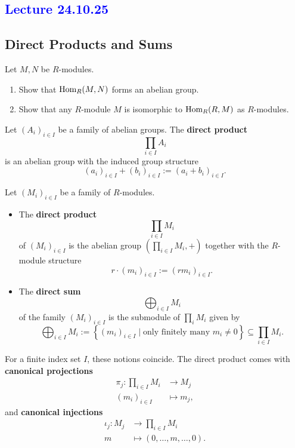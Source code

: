 \subsection{\textcolor{blue}{Lecture 24.10.25}}
\subsection*{Direct Products and Sums}
\begin{ex}
    Let $M,N$ be $R$-modules.
   \begin{enumerate}
       \item Show that $\operatorname{\text{Hom}}_R(M,N)$ forms an abelian group.
        \item Show that any $R$-module $M$ is isomorphic to $\operatorname{\text{Hom}}_R(R,M)$ as $R$-modules.
   \end{enumerate} 
\end{ex}
\begin{definition}
    Let $(A_i)_{i \in I}$ be a family of abelian groups. The \textbf{direct product} \[
        \prod_{i \in I} A_i
    \] is an abelian group with the induced group structure \[
    (a_i)_{i \in I} + (b_i)_{i \in I} := (a_i + b_i)_{i \in I}
    .\]  
\end{definition}
\begin{definition}
    Let $(M_i)_{i \in I}$ be a family of $R$-modules.
    \begin{itemize}
        \item The \textbf{direct product} \[
                \prod_{i \in I}M_i
            \] of $(M_i)_{i \in I}$ is the abelian group $(\prod_{i \in I}M_i,+) $ together with the $R$-module structure \[
            r \cdot (m_i)_{i \in I} := (rm_i)_{i \in I}
            .\] 
        \item The \textbf{direct sum} \[
                \bigoplus_{i \in I} M_i
            \] of the family $(M_i)_{i \in I}$ is the submodule of $\prod_iM_i$ given by \[
            \bigoplus_{i \in I} M_i:= \left\{(m_i)_{i \in I} \mid \text{only finitely many } m_i \neq 0\right\} \subseteq \prod_{i \in I} M_i 
            .\] 
    \end{itemize}
\end{definition}
\begin{remark}
   For a finite index set $I$, these notions coincide. The direct product comes with \textbf{canonical projections}
   \begin{align*}
       \pi_j: \prod_{i \in I} M_i &\to M_j\\ 
       (m_i)_{i \in I} &\mapsto m_j,
   \end{align*}
   and \textbf{canonical injections}
   \begin{align*}
       \iota_j: M_j &\to  \prod_{i \in I} M_i\\
       m &\mapsto (0,\dots,m ,\dots,0).
   \end{align*}
\end{remark}
